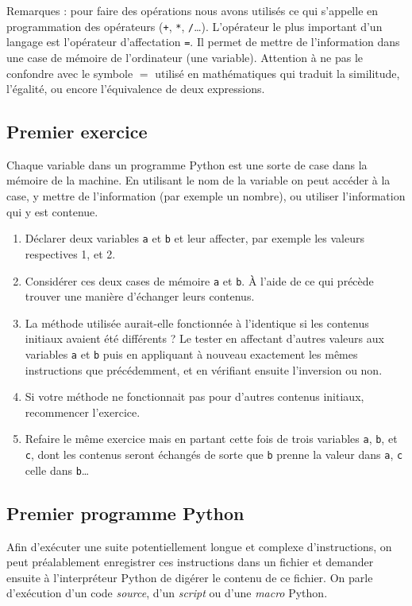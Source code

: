 Remarques : pour faire des opérations nous avons utilisés
ce qui s'appelle en programmation des opérateurs
(\verb_+_, \verb+*+, \verb+/+\ldots).
L'opérateur le plus important d'un langage est l'opérateur d'affectation \verb+=+.
Il permet de mettre de l'information dans une case de mémoire de l'ordinateur (une variable).
Attention à ne pas le confondre avec le symbole $=$ utilisé en mathématiques qui traduit
la similitude, l'égalité, ou encore l'équivalence de deux expressions. 



\subsection{Premier exercice}
Chaque variable dans un programme Python est une sorte de case
dans la mémoire de la machine. En utilisant le nom de la variable
on peut accéder à la case, y mettre de l'information (par exemple un
nombre), ou utiliser l'information qui y est contenue.
\begin{enumerate}
\item Déclarer deux variables \verb+a+ et \verb+b+ et
  leur affecter, par exemple les valeurs respectives 1, et 2.
\item Considérer ces deux cases de mémoire \verb+a+ et \verb+b+.
  À l'aide de ce qui précède trouver
  une manière d'échanger leurs contenus.
\item La méthode utilisée aurait-elle fonctionnée à l'identique
  si les contenus initiaux avaient été
  différents ? Le tester en affectant
  d'autres valeurs aux variables \verb+a+ et \verb+b+ puis en
  appliquant à nouveau exactement les mêmes instructions que
  précédemment, et en vérifiant ensuite l'inversion ou non.
\item Si votre méthode ne fonctionnait pas pour d'autres
  contenus initiaux, recommencer l'exercice.
  
\item Refaire le même exercice mais en partant cette fois de trois
  variables \verb+a+, \verb+b+, et \verb+c+, dont les contenus
  seront échangés de sorte que \verb+b+ prenne la valeur dans \verb+a+,
  \verb+c+ celle dans \verb+b+\ldots
\end{enumerate}

\subsection{Premier programme Python}

Afin  d'exécuter   une  suite   potentiellement  longue   et  complexe
d'instructions, on peut
préalablement enregistrer ces instructions dans un fichier et demander
ensuite à l'interpréteur Python de  \og{}digérer\fg{} le contenu de ce
fichier.   On  parle   d'exécution  d'un   code  \emph{source},   d'un
\emph{script} ou d'une \emph{macro} Python.

